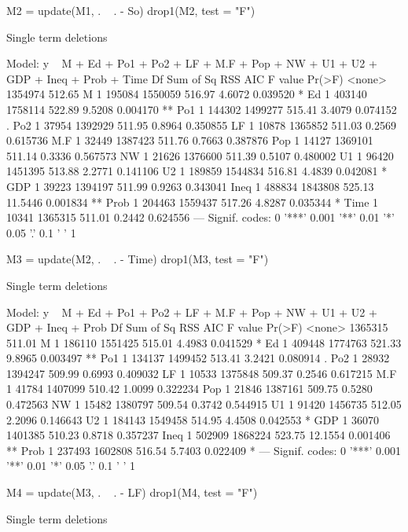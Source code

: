 \documentclass[a4paper]{article}
\begin{document}
\begin{Schunk}
\begin{Sinput}
M2 = update(M1, . ~ . - So)
drop1(M2, test = "F")
\end{Sinput}
\begin{Soutput}
Single term deletions

Model:
y ~ M + Ed + Po1 + Po2 + LF + M.F + Pop + NW + U1 + U2 + GDP + 
    Ineq + Prob + Time
       Df Sum of Sq     RSS    AIC F value   Pr(>F)   
<none>              1354974 512.65                    
M       1    195084 1550059 516.97  4.6072 0.039520 * 
Ed      1    403140 1758114 522.89  9.5208 0.004170 **
Po1     1    144302 1499277 515.41  3.4079 0.074152 . 
Po2     1     37954 1392929 511.95  0.8964 0.350855   
LF      1     10878 1365852 511.03  0.2569 0.615736   
M.F     1     32449 1387423 511.76  0.7663 0.387876   
Pop     1     14127 1369101 511.14  0.3336 0.567573   
NW      1     21626 1376600 511.39  0.5107 0.480002   
U1      1     96420 1451395 513.88  2.2771 0.141106   
U2      1    189859 1544834 516.81  4.4839 0.042081 * 
GDP     1     39223 1394197 511.99  0.9263 0.343041   
Ineq    1    488834 1843808 525.13 11.5446 0.001834 **
Prob    1    204463 1559437 517.26  4.8287 0.035344 * 
Time    1     10341 1365315 511.01  0.2442 0.624556   
---
Signif. codes:  0 '***' 0.001 '**' 0.01 '*' 0.05 '.' 0.1 ' ' 1
\end{Soutput}
\begin{Sinput}
M3 = update(M2, . ~ . - Time)
drop1(M3, test = "F")
\end{Sinput}
\begin{Soutput}
Single term deletions

Model:
y ~ M + Ed + Po1 + Po2 + LF + M.F + Pop + NW + U1 + U2 + GDP + 
    Ineq + Prob
       Df Sum of Sq     RSS    AIC F value   Pr(>F)   
<none>              1365315 511.01                    
M       1    186110 1551425 515.01  4.4983 0.041529 * 
Ed      1    409448 1774763 521.33  9.8965 0.003497 **
Po1     1    134137 1499452 513.41  3.2421 0.080914 . 
Po2     1     28932 1394247 509.99  0.6993 0.409032   
LF      1     10533 1375848 509.37  0.2546 0.617215   
M.F     1     41784 1407099 510.42  1.0099 0.322234   
Pop     1     21846 1387161 509.75  0.5280 0.472563   
NW      1     15482 1380797 509.54  0.3742 0.544915   
U1      1     91420 1456735 512.05  2.2096 0.146643   
U2      1    184143 1549458 514.95  4.4508 0.042553 * 
GDP     1     36070 1401385 510.23  0.8718 0.357237   
Ineq    1    502909 1868224 523.75 12.1554 0.001406 **
Prob    1    237493 1602808 516.54  5.7403 0.022409 * 
---
Signif. codes:  0 '***' 0.001 '**' 0.01 '*' 0.05 '.' 0.1 ' ' 1
\end{Soutput}
\begin{Sinput}
M4 = update(M3, . ~ . - LF)
drop1(M4, test = "F")
\end{Sinput}
\begin{Soutput}
Single term deletions


\end{Soutput}
\end{Schunk}
\end{document}
